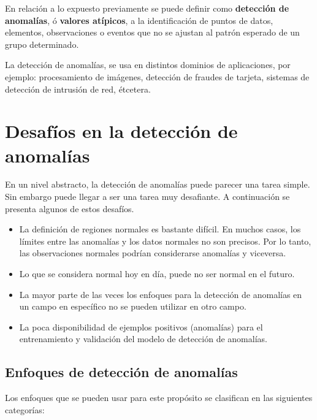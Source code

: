 En relaci\'{o}n a lo expuesto previamente se puede definir como \textbf{detecci\'{o}n de anomal\'{i}as}, \'{o} \textbf{valores at\'{i}picos}, a la identificación de puntos de datos, elementos, observaciones o eventos que no se ajustan al patrón esperado de un grupo determinado. 

\vspace{5mm} %

La detecci\'{o}n de anomal\'{i}as, se usa en distintos dominios de aplicaciones, por ejemplo: procesamiento de im\'{a}genes, detecci\'{o}n de fraudes de tarjeta, sistemas de detecci\'{o}n de intrusi\'{o}n de red, \'{e}tcetera.

\section{Desaf\'{i}os en la detecci\'{o}n de anomal\'{i}as}

En un nivel abstracto, la detecci\'{o}n de anomal\'{i}as puede parecer una tarea simple. Sin embargo puede llegar a ser una tarea muy desafiante. A continuaci\'{o}n se presenta algunos de estos desaf\'{i}os.

\begin{itemize}
\item La definici\'{o}n de regiones normales es bastante dif\'{i}cil. En muchos casos, los l\'{i}mites entre las anomal\'{i}as y los datos normales no son precisos. Por lo tanto, las observaciones normales podr\'{i}an considerarse anomal\'{i}as y viceversa.

\item Lo que se considera normal hoy en d\'{i}a, puede no ser normal en el futuro.

\item La mayor parte de las veces los enfoques para la detecci\'{o}n de anomal\'{i}as en un campo en espec\'{i}fico no se pueden utilizar en otro campo.

\item La poca disponibilidad de ejemplos positivos (anomal\'{i}as) para el entrenamiento y validaci\'{o}n del modelo de detecci\'{o}n de anomal\'{i}as.

\end{itemize}

\subsection{Enfoques de detecci\'{o}n de anomal\'{i}as}

Los enfoques que se pueden usar para este prop\'{o}sito se clasifican en las siguientes categor\'{i}as:

